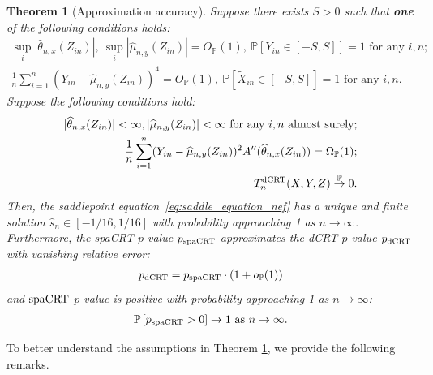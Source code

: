 \documentclass[12pt]{article}
\newtheorem{theorem}{Theorem}
\theoremstyle{definition}
\def\P{\mathbb{P}}
\def\P{\mathbb{P}}
\renewcommand{\P}{\mathbb{P}}							%
\newcommand{\convp}{\overset{\mathbb{P}}{\rightarrow}}             %
\newcommand{\srx}{X}									%
\newcommand{\srz}{Z}									%
\newcommand{\srxk}{\widetilde X}						%
\newcommand{\sry}{Y}									%
\newcommand{\dCRT}{\textnormal{dCRT}} 					%
\newcommand{\spacrt}{\textnormal{spaCRT}}               %
\begin{document}
\begin{theorem}[Approximation accuracy]\label{thm:validity_spacrt}
  Suppose there exists $S>0$ such that \textbf{one} of the following conditions holds:
  \begin{align}
    \sup_{i}|\widehat{\theta}_{n,x}(\srz_{in})|,\ \sup_{i}|\widehat{\mu}_{n,y}(\srz_{in})| = O_{\P}(1),\  \P[\sry_{in}\in [-S,S]]=1\text{ for any }i,n\label{eq:cse_assumption}\tag{CSE};\\
    \frac{1}{n}\sum_{i=1}^n (\sry_{in}-\widehat{\mu}_{n,y}(\srz_{in}))^4=O_{\P}(1),\ \P\left[\srxk_{in}\in [-S,S]\right]=1\text{ for any }i,n\label{eq:ccs_assumption}\tag{CCS}.
  \end{align}
	Suppose the following conditions hold:
	\begin{align}
		|\widehat \theta_{n,x}(\srz_{in})|<\infty,|\widehat \mu_{n,y}(\srz_{in})|<\infty\text{ for any $i,n$ almost surely};\label{eq:upper_bound_theta_a} \\
		\frac{1}{n}\sum_{i=1}^n (Y_{in}-\widehat{\mu}_{n,y}(Z_{in}))^2 A''(\widehat \theta_{n,x}(\srz_{in}))=\Omega_{\P}(1);\label{eq:lower_bound_spacrt}\\
		T_n^{\dCRT}(\srx,\sry,\srz)\convp 0\label{eq:x_n_convergence_spacrt}.
	\end{align}
	Then, the saddlepoint equation~\eqref{eq:saddle_equation_nef} has a unique and finite solution $\hat s_n \in [-1/16, 1/16]$ with probability approaching 1 as $n \rightarrow \infty$. Furthermore, the spaCRT $p$-value $p_{\spacrt}$ approximates the dCRT $p$-value $p_{\dCRT}$ with vanishing relative error:
	\begin{align}\label{eq:approximation_accuracy_spacrt}
		p_{\dCRT} = p_{\spacrt}\cdot (1+o_\P(1))
	\end{align}
  and $\spacrt$ $p$-value is positive with probability approaching 1 as $n\rightarrow\infty$:
  \begin{align}\label{eq:spacrt_pvalue_positivity}
    \P\left[p_{\spacrt}>0\right]\rightarrow1 \text{ as }n\rightarrow\infty.
  \end{align}
\end{theorem}

\noindent To better understand the assumptions in Theorem \ref{thm:validity_spacrt}, we provide the following remarks.
\end{document}
